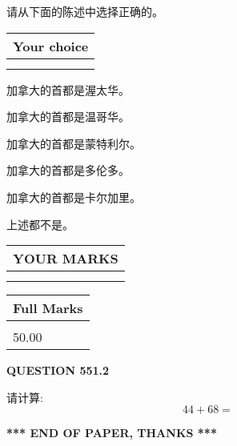 \documentclass{ctexart}
\begin{document}
  
请从下面的陈述中选择正确的。
  
  
\noindent\hspace{3.0in} \begin{tabular}{|l|}
\hline
Your choice \\
\hline
 \\ 
 \\ 
\hline
\end{tabular}
  
  
 
 
加拿大的首都是渥太华。
 
 
加拿大的首都是温哥华。
 
 
加拿大的首都是蒙特利尔。
 
 
加拿大的首都是多伦多。
 
 
加拿大的首都是卡尔加里。
 
 
 上述都不是。
 
 
  
\vspace{0.2in}
  
\noindent\begin{tabular}{|l|}
\hline
 YOUR MARKS  \\
\hline
 \\ 
 \\ 
\hline
\end{tabular}
\hspace{0.05in} \begin{tabular}{|l|}
\hline
 Full Marks  \\
\hline
 \\ 
50.00 \\
\hline
\end{tabular}
{\textbf{\Large{QUESTION
551.2 
}}}
  
  
 
请计算:
\begin{equation}
44 +  %
68 = \nonumber
\end{equation}
 

 

 
   
   
 \vspace{0.2in}
 
   
   
   
   
\vspace{1.0in} 
{\textbf{\large{ *** END OF PAPER, THANKS *** }}} 
   
\end{document}
